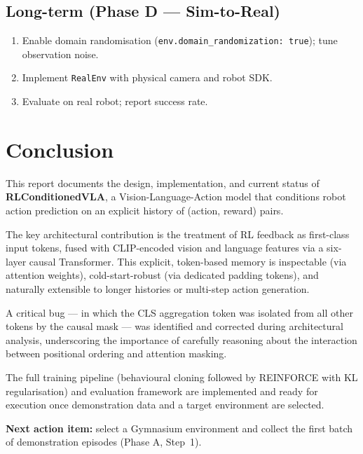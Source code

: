 \documentclass[12pt, a4paper]{article}
\begin{document}
\subsection{Long-term (Phase D — Sim-to-Real)}

\begin{enumerate}[leftmargin=1.5em]
  \item Enable domain randomisation (\texttt{env.domain\_randomization: true});
        tune observation noise.
  \item Implement \texttt{RealEnv} with physical camera and robot SDK.
  \item Evaluate on real robot; report success rate.
\end{enumerate}

\newpage

\section{Conclusion}
\label{sec:conclusion}

This report documents the design, implementation, and current status of
\textbf{RLConditionedVLA}, a Vision-Language-Action model that conditions
robot action prediction on an explicit history of (action, reward) pairs.

The key architectural contribution is the treatment of RL feedback as
first-class input tokens, fused with CLIP-encoded vision and language
features via a six-layer causal Transformer.
This explicit, token-based memory is inspectable (via attention weights),
cold-start-robust (via dedicated padding tokens), and naturally extensible
to longer histories or multi-step action generation.

A critical bug — in which the CLS aggregation token was isolated from all
other tokens by the causal mask — was identified and corrected during
architectural analysis, underscoring the importance of carefully reasoning
about the interaction between positional ordering and attention masking.

The full training pipeline (behavioural cloning followed by REINFORCE with
KL regularisation) and evaluation framework are implemented and ready for
execution once demonstration data and a target environment are selected.

\bigskip
\noindent\textbf{Next action item:} select a Gymnasium environment and collect
the first batch of demonstration episodes (Phase A, Step~1).
\end{document}
